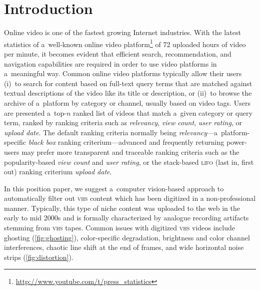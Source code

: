 \documentclass[runningheads,a4paper]{llncs}
\begin{document}
\section{Introduction}
Online video is one of the fastest growing Internet industries.
With the latest statistics of a~well-known online video
platform\footnote{\url{http://www.youtube.com/t/press_statistics}}
of 72 uploaded hours of video per minute,
it becomes evident that efficient search, recommendation, and
navigation capabilities are required in order to use 
video platforms in a~meaningful way. 
Common online video platforms typically allow their users
(i)~to search for content based on full-text query terms
that are matched against textual descriptions
of the video like its title or description,
or (ii)~to browse the archive of a~platform by category or channel,
usually based on video tags.
Users are presented a~top-$n$ ranked list of videos
that match a~given category
or query term, ranked by ranking criteria such as
\emph{relevancy}, \emph{view count},
\emph{user rating}, or \emph{upload date}.
The default ranking criteria normally being
\emph{relevancy}---a~platform-specific \emph{black box}
ranking criterium---advanced and frequently returning power-users
may prefer more transparent and traceable ranking criteria
such as the popularity-based \emph{view count}
and \emph{user rating}, or the stack-based
{\scshape lifo} (last in, first out) ranking criterium \emph{upload date}.

In this position paper, we suggest a~computer vision-based
approach to automatically filter out {\scshape vhs} content 
which has been digitized in a non-professional manner. 
Typically, this type of niche content was uploaded to the web
in the early to mid 2000s and is formally characterized by 
analogue recording artifacts stemming from {\scshape vhs} tapes. 
Common issues with digitized {\scshape vhs} videos include 
ghosting (\autoref{fig:ghosting}),
color-specific degradation,
brightness and color channel interferences,
chaotic line shift at the end of frames,
and wide horizontal noise strips (\autoref{fig:distortion}).
\end{document}
